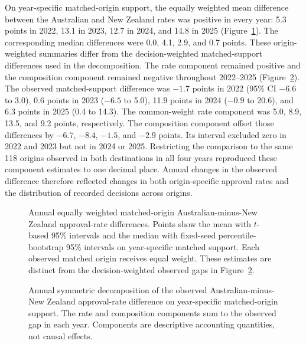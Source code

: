 \documentclass[runningheads]{llncs}
\begin{document}
On year-specific matched-origin support, the equally weighted mean difference between the Australian and New Zealand rates was positive in every year: 5.3 points in 2022, 13.1 in 2023, 12.7 in 2024, and 14.8 in 2025 (Figure~\ref{fig:annual-matched-differences}). The corresponding median differences were 0.0, 4.1, 2.9, and 0.7 points. These origin-weighted summaries differ from the decision-weighted matched-support differences used in the decomposition. The rate component remained positive and the composition component remained negative throughout 2022--2025 (Figure~\ref{fig:annual-decomposition-components}). The observed matched-support difference was $-1.7$ points in 2022 (95\% CI $-6.6$ to 3.0), 0.6 points in 2023 ($-6.5$ to 5.0), 11.9 points in 2024 ($-0.9$ to 20.6), and 6.3 points in 2025 (0.4 to 14.3). The common-weight rate component was 5.0, 8.9, 13.5, and 9.2 points, respectively. The composition component offset those differences by $-6.7$, $-8.4$, $-1.5$, and $-2.9$ points. Its interval excluded zero in 2022 and 2023 but not in 2024 or 2025. Restricting the comparison to the same 118 origins observed in both destinations in all four years reproduced these component estimates to one decimal place. Annual changes in the observed difference therefore reflected changes in both origin-specific approval rates and the distribution of recorded decisions across origins.



\begin{figure}
\centering

\caption{Annual equally weighted matched-origin Australian-minus-New Zealand approval-rate differences. Points show the mean with $t$-based 95\% intervals and the median with fixed-seed percentile-bootstrap 95\% intervals on year-specific matched support. Each observed matched origin receives equal weight. These estimates are distinct from the decision-weighted observed gaps in Figure~\ref{fig:annual-decomposition-components}.}
\label{fig:annual-matched-differences}
\end{figure}

\begin{figure}
\centering

\caption{Annual symmetric decomposition of the observed Australian-minus-New Zealand approval-rate difference on year-specific matched-origin support. The rate and composition components sum to the observed gap in each year. Components are descriptive accounting quantities, not causal effects.}
\label{fig:annual-decomposition-components}
\end{figure}
\end{document}
